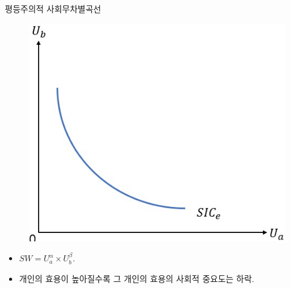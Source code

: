 \documentclass[aspectratio=169,xcolor=dvipsnames,handout]{beamer}
\begin{document}
\begin{frame}{평등주의적 사회무차별곡선}
    \begin{figure}
        \centering
        \includegraphics[scale=.4]{pic/Egalitarian.jpg}
        \label{fig:Egalitarian}
    \end{figure}
    \begin{itemize}
       \item $SW=U_a ^\alpha \times U_b ^\beta$.
       \item 개인의 효용이 높아질수록 그 개인의 효용의 사회적 중요도는 하락.
    \end{itemize}
\end{frame}
\end{document}
